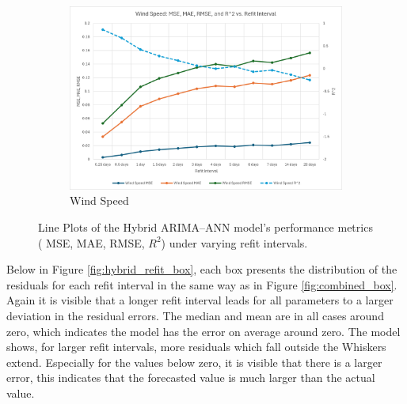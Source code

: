 \begin{figure}[ht!]
\begin{subfigure}[b]{0.49\textwidth}
        \includegraphics[width=\textwidth]{graphs/Refit_wind_speed_metrics.png}
        \caption{Wind Speed}
        \label{fig:wind_speed_refit}
    \end{subfigure}
    \caption{Line Plots of the Hybrid ARIMA–ANN model’s performance metrics ( MSE, MAE, RMSE, $R^{2}$) under varying refit intervals.}
    \label{fig:hybrid_refit_metrics}
\end{figure}

\newpage

\noindent Below in Figure \ref{fig:hybrid_refit_box}, each box presents the distribution of the residuals for each refit interval in the same way as in Figure \ref{fig:combined_box}. Again it is visible that a longer refit interval leads for all parameters to a larger deviation in the residual errors. The median and mean are in all cases around zero, which indicates the model has the error on average around zero. The model shows, for larger refit intervals, more residuals which fall outside the Whiskers extend. Especially for the values below zero, it is visible that there is a larger error, this indicates that the forecasted value is much larger than the actual value. 


